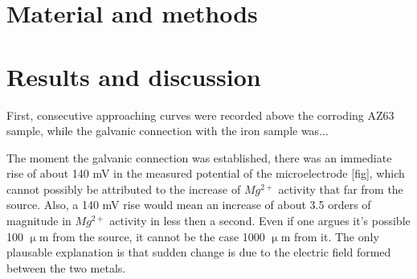\documentclass[3p]{elsarticle}
\begin{document}
\section{Material and methods}
\section{Results and discussion}

First, consecutive approaching curves were recorded above the corroding AZ63 sample, while the galvanic connection with the iron sample was...

The moment the galvanic connection was established, there was an immediate rise of about 140 mV in the measured potential of the microelectrode [fig], which cannot possibly be attributed to the increase of $Mg^{2+}$ activity that far from the source. Also, a 140 mV rise would mean an increase of about 3.5 orders of magnitude in $Mg^{2+}$ activity in less then a second. Even if one argues it's possible 100 $\upmu$m from the source, it cannot be the case 1000 $\upmu$m from it. The only plausable explanation is that sudden change is due to the electric field formed between the two metals. 
\end{document}
